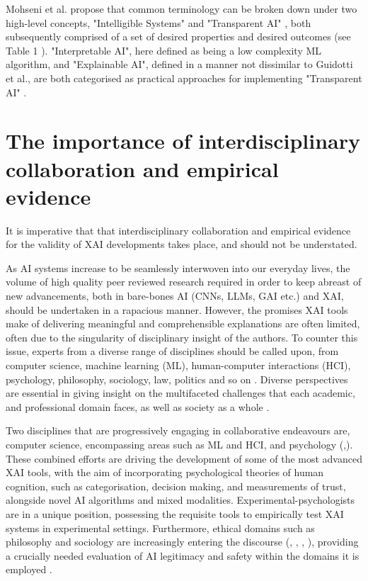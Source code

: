 Mohseni et al. \cite{mohseniMultidisciplinarySurveyFramework2021} propose that common terminology can be broken down under two high-level concepts, "Intelligible Systems" and "Transparent AI" \cite{mohseniMultidisciplinarySurveyFramework2021}, both subsequently comprised of a set of desired properties and desired outcomes (see Table 1 \cite{mohseniMultidisciplinarySurveyFramework2021}). "Interpretable AI", here defined as being a low complexity ML algorithm, and "Explainable AI", defined in a manner not dissimilar to Guidotti et al., are both categorised as practical approaches for implementing "Transparent AI" \cite{mohseniMultidisciplinarySurveyFramework2021}.


\section{The importance of interdisciplinary collaboration and empirical evidence}

It is imperative that that interdisciplinary collaboration and empirical evidence for the validity of XAI developments takes place, and should not be understated.

As AI systems increase to be seamlessly interwoven into our everyday lives, the volume of high quality peer reviewed research required in order to keep abreast of new advancements, both in bare-bones AI (CNNs, LLMs, GAI etc.) and XAI, should be undertaken in a rapacious manner. However, the promises XAI tools make of delivering meaningful and comprehensible explanations are often limited, often due to the singularity of disciplinary insight of the authors. To counter this issue, experts from a diverse range of disciplines should be called upon, from computer science, machine learning (ML), human-computer interactions (HCI), psychology, philosophy, sociology, law, politics and so on \cite{cabitzaQuodEratDemonstrandum2023}.  Diverse perspectives are essential in giving insight on the multifaceted challenges that each academic, and professional domain faces, as well as society as a whole \cite{lazarAISafetyWhose2023}.

Two disciplines that are progressively engaging in collaborative endeavours are, computer science, encompassing areas such as ML and HCI, and psychology (\cite{grangeXAISelfexplanatoryAI2022},\cite{hoffmanEvaluatingMachinegeneratedExplanations2023}). These combined efforts are driving the development of some of the most advanced XAI tools, with the aim of incorporating psychological theories of human cognition, such as categorisation, decision making, and measurements of trust, alongside novel AI algorithms and mixed modalities. Experimental-psychologists are in a unique position, possessing the requisite tools to empirically test XAI systems in experimental settings. Furthermore, ethical domains such as philosophy and sociology are increasingly entering the discourse (\cite{lazarAISafetyWhose2023}, \cite{lazarPowerAINature2022}, \cite{bennWhatWrongAutomated2022}, \cite{zimmermannPoliticalPhilosophyData2022}), providing a crucially needed evaluation of AI legitimacy and safety within the domains it is employed \cite{greeneAIGovernanceMultistakeholder2022}.

